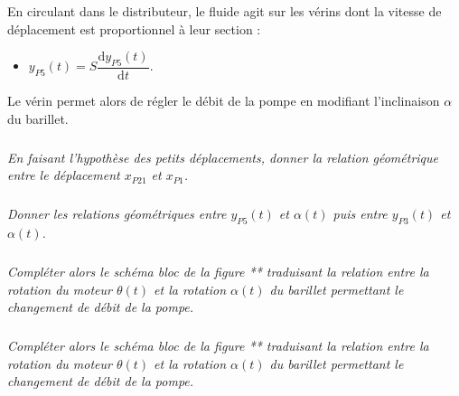 \documentclass[10pt,fleqn]{article} %
\begin{document}
\begin{multicols}{2}
En circulant dans le distributeur, le fluide agit sur les vérins dont la vitesse de déplacement est proportionnel à leur section : 
\begin{itemize}
\item $y_{P5}(t)= S \dfrac{\text{d}y_{P5}(t)}{\text{d}t}$.
\end{itemize}


Le vérin permet alors de régler le débit de la pompe en modifiant l'inclinaison $\alpha$ du barillet.


\subparagraph{}
\textit{En faisant l'hypothèse des petits déplacements, donner la relation géométrique entre le déplacement $x_{P21}$ et $x_{P1}$.}
\begin{corrige}

\end{corrige}

\subparagraph{}
\textit{Donner les relations géométriques entre $y_{P5}(t)$ et $\alpha(t)$ puis entre $y_{P3}(t)$ et $\alpha(t)$.}
\begin{corrige}

\end{corrige}

\subparagraph{}
\textit{Compléter alors le schéma bloc de la figure ** traduisant la relation entre la rotation du moteur $\theta(t)$ et la rotation $\alpha(t)$ du barillet permettant le changement de débit de la pompe.}
\begin{corrige}

\end{corrige}

\subparagraph{}
\textit{Compléter alors le schéma bloc de la figure ** traduisant la relation entre la rotation du moteur $\theta(t)$ et la rotation $\alpha(t)$ du barillet permettant le changement de débit de la pompe.}
\begin{corrige}

\end{corrige}

\end{multicols}
\end{document}
